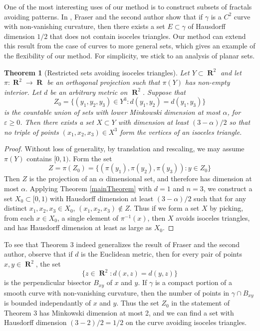 \documentclass[dvipsnames,letterpaper,12pt]{article}
\numberwithin{equation}{section}
\theoremstyle{plain}
\newtheorem{theorem}{Theorem}
\DeclareMathOperator{\RR}{\mathbf{R}}
\begin{document}
One of the most interesting uses of our method is to construct subsets of fractals avoiding patterns. In \cite{MalabikaRob}, Fraser and the second author show that if $\gamma$ is a $C^2$ curve with non-vanishing curvature, then there exists a set $E \subset \gamma$ of Hausdorff dimension $1/2$ that does not contain isoceles triangles. Our method can extend this result from the case of curves to more general sets, which gives an example of the flexibility of our method. For simplicity, we stick to an analysis of planar sets.

\begin{theorem}[Restricted sets avoiding isoceles triangles]
	Let $Y \subset \RR^2$ and let $\pi: \RR^2 \to \RR$ be an orthogonal projection such that $\pi(Y)$ has non-empty interior. Let $d$ be an arbitrary metric on $\RR^2$. Suppose that
	\[ Z_0 = \{ (y_1, y_2, y_3) \in Y^3: d(y_1,y_2) = d(y_1,y_3) \} \]
	is the countable union of sets with lower Minkowski dimension at most $\alpha$, for $\varepsilon \geq 0$. Then there exists a set $X \subset Y$ with dimension at least $(3 - \alpha)/2$ so that no triple of points $(x_1, x_2, x_3) \in X^3$ form the vertices of an isoceles triangle.
\end{theorem}
\begin{proof}
	Without loss of generality, by translation and rescaling, we may assume $\pi(Y)$ contains $[0,1)$. Form the set
	\[ Z = \pi(Z_0) = \{ (\pi(y_1), \pi(y_2), \pi(y_3)) : y \in Z_0 \} \]
	Then $Z$ is the projection of an $\alpha$ dimensional set, and therefore has dimension at most $\alpha$. Applying Theorem \ref{mainTheorem} with $d = 1$ and $n = 3$, we construct a set $X_0 \subset [0,1)$ with Hausdorff dimension at least $(3 - \alpha)/2$ such that for any distinct $x_1,x_2,x_3 \in X_0$, $(x_1,x_2,x_3) \not \in Z$. Thus if we form a set $X$ by picking, from each $x \in X_0$, a single element of $\pi^{-1}(x)$, then $X$ avoids isoceles triangles, and has Hausdorff dimension at least as large as $X_0$.
\end{proof}

To see that Theorem 3 indeed generalizes the result of Fraser and the second author, observe that if $d$ is the Euclidean metric, then for every pair of points $x,y \in \RR^2$, the set
%
\[ \{ z \in \RR^2: d(x,z) = d(y,z) \} \]
%
is the perpendicular bisector $B_{xy}$ of $x$ and $y$. If $\gamma$ is a compact portion of a smooth curve with non-vanishing curvature, then the number of points in $\gamma \cap B_{xy}$ is bounded independantly of $x$ and $y$. Thus the set $Z_0$ in the statement of Theorem 3 has Minkowski dimension at most 2, and we can find a set with Hausdorff dimension $(3 - 2)/2 = 1/2$ on the curve avoiding isoceles triangles.
\end{document}
